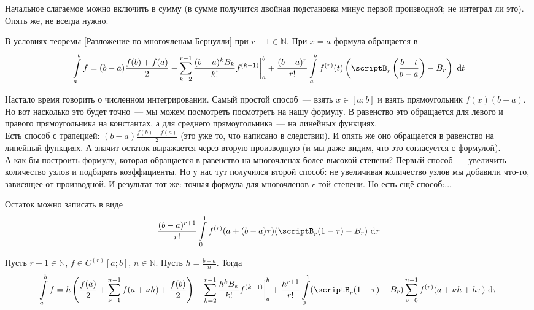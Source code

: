 \documentclass{article}
\begin{document}
    \begin{remark}
        Начальное слагаемое можно включить в сумму (в сумме получится двойная подстановка минус первой производной; не интеграл ли это). Опять же, не всегда нужно.
    \end{remark}
    \begin{corollary}
        \label{cor:разложение по бернулли,1}
        В условиях теоремы \ref{Разложение по многочленам Бернулли} при $r-1\in\mathbb N$.
        При $x=a$ формула обращается в
        $$
        \int\limits_a^bf=(b-a)\frac{f(b)+f(a)}2-\sum\limits_{k=2}^{r-1}\frac{(b-a)^kB_k}{k!}f^{(k-1)}\bigg|_a^b+\frac{(b-a)^r}{r!}\int\limits_a^bf^{(r)}(t)\left(\scriptB_r\left(\frac{b-t}{b-a}\right)-B_r\right)~\mathrm dt
        $$
    \end{corollary}
    \begin{remark}
        Настало время говорить о численном интегрировании. Самый простой способ~--- взять $x\in[a;b]$ и взять прямоугольник $f(x)(b-a)$. Но вот насколько это будет точно~--- мы можем посмотреть посмотреть на нашу формулу. В равенство это обращается для левого и правого прямоугольника на константах, а для среднего прямоугольника~--- на линейных функциях.\\
        Есть способ с трапецией: $(b-a)\frac{f(b)+f(a)}2$ (это уже то, что написано в следствии). И опять же оно обращается в равенство на линейный функциях. А значит остаток выражается через вторую производную (и мы даже видим, что это согласуется с формулой).\\
        А как бы построить формулу, которая обращается в равенство на многочленах более высокой степени? Первый способ~--- увеличить количество узлов и подбирать коэффициенты. Но у нас тут получился второй способ: не увеличивая количество узлов мы добавили что-то, зависящее от производной. И результат тот же: точная формула для многочленов $r$-той степени. Но есть ещё способ:...
    \end{remark}
    \begin{remark}
        Остаток можно записать в виде
        $$
        \frac{(b-a)^{r+1}}{r!}\int\limits_0^1f^{(r)}(a+(b-a)\tau)(\scriptB_r(1-\tau)-B_r)~\mathrm d\tau
        $$
    \end{remark}
    \begin{theorem}
        Пусть $r-1\in\mathbb N$, $f\in C^{(r)}[a;b]$, $n\in\mathbb N$. Пусть $h=\frac{b-a}n$. Тогда
        $$
        \int\limits_a^bf=h\left(\frac{f(a)}2+\sum\limits_{\nu=1}^{n-1}f(a+\nu h)+\frac{f(b)}2\right)-\sum\limits_{k=2}^{r-1}\frac{h^kB_k}{k!}f^{(k-1)}\bigg|_a^b+\frac{h^{r+1}}{r!}\int\limits_0^1(\scriptB_r(1-\tau)-B_r)\sum\limits_{\nu=0}^{n-1}f^{(r)}(a+\nu h+h\tau)~\mathrm d\tau
        $$
    \end{theorem}
\end{document}
